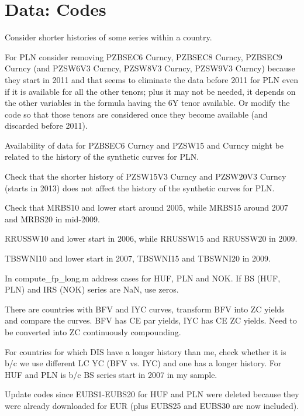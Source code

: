 \documentclass[12pt]{article}
\newcommand{\cmark}{\ding{51}}
\newcommand{\xmark}{\ding{55}}
\newcommand{\done}{\rlap{$\square$}{\raisebox{2pt}{\large\hspace{1pt}\cmark}}%
	\hspace{-2.5pt}}
\newcommand{\wontdo}{\rlap{$\square$}{\large\hspace{1pt}\xmark}}
\begin{document}
\section{Data: Codes}
\begin{todolist}
	\item Consider shorter histories of some series within a country.
	\begin{todolist}
		\item For PLN consider removing PZBSEC6 Curncy, PZBSEC8 Curncy, PZBSEC9 Curncy (and PZSW6V3 Curncy, PZSW8V3 Curncy, PZSW9V3 Curncy) because they start in 2011 and that seems to eliminate the data before 2011 for PLN even if it is available for all the other tenors; plus it may not be needed, it depends on the other variables in the formula having the 6Y tenor available. Or modify the code so that those tenors are considered once they become available (and discarded before 2011).
		\item Availability of data for PZBSEC6 Curncy and PZSW15 and Curncy might be related to the history of the synthetic curves for PLN.
		\item Check that the shorter history of PZSW15V3 Curncy and PZSW20V3 Curncy (starts in 2013) does not affect the history of the synthetic curves for PLN.
		\item Check that MRBS10 and lower start around 2005, while MRBS15 around 2007 and MRBS20 in mid-2009.
		\item RRUSSW10 and lower start in 2006, while RRUSSW15 and RRUSSW20 in 2009.
		\item TBSWNI10  and lower start in 2007, TBSWNI15 and TBSWNI20 in 2009.
	\end{todolist}
	\item[\done] In compute_fp_long.m address cases for HUF, PLN and NOK. If BS (HUF, PLN) and IRS (NOK) series are NaN, use zeros.
	\item[\done] There are countries with BFV and IYC curves, transform BFV into ZC yields and compare the curves. BFV has CE par yields, IYC has CE ZC yields. Need to be converted into ZC continuously compounding.
	\item[\wontdo] For countries for which DIS have a longer history than me, check whether it is b/c we use different LC YC (BFV vs. IYC) and one has a longer history. For HUF and PLN is b/c BS series start in 2007 in my sample.
	\item[\done] Update codes since EUBS1-EUBS20 for HUF and PLN were deleted because they were already downloaded for EUR (plus EUBS25 and EUBS30 are now included).
\end{todolist}
\end{document}
